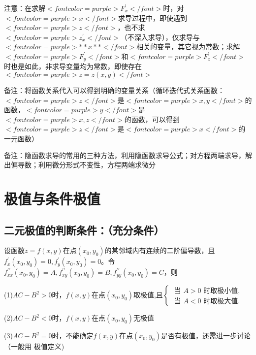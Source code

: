 注意：在求解$ <font color=purple>F^{\prime}_x</font> $时，对$ <font color=purple>x</font> $求导过程中，即使遇到$ <font color=purple>z</font> $，也不求$ <font color=purple>z^{\prime}_x</font> $（不深入求导），仅求导与$ <font color=purple>**x**</font> $相关的变量，其它视为常数；求解$ <font color=purple>F^{\prime}_y</font> $和$ <font color=purple>F^{\prime}_z</font> $时也是如此，非求导变量均为常数，即使存在$ <font color=purple>z=z(x, y)</font> $

备注：将函数关系代入可以得到明确的变量关系（循环迭代式关系函数：$ <font color=purple>z</font> $是$ <font color=purple>x,y</font> $的函数，$ <font color=purple>y</font> $是$ <font color=purple>x,z</font> $的函数，可以得到$ <font color=purple>z</font> $是$ <font color=purple>x</font> $的一元函数）

备注：隐函数求导的常用的三种方法，利用隐函数求导公式；对方程两端求导，解出偏导数；利用微分形式不变性，方程两端求微分

\section{极值与条件极值}



\subsection{二元极值的判断条件：（充分条件）}

设函数$ z=f(x, y) $在点$ \left(x_{0}, y_{0}\right) $的某邻域内有连续的二阶偏导数，且$ f_{x}^{\prime}\left(x_{0}, y_{0}\right)=0, f_{y}^{\prime}\left(x_{0}, y_{0}\right)=0 $。令$ f_{x x}^{\prime \prime}\left(x_{0}, y_{0}\right)=A, f_{x y}^{\prime \prime}\left(x_{0}, y_{0}\right)=B, f_{y y}^{\prime \prime}\left(x_{0}, y_{0}\right)=C $，则

(1)$ A C-B^{2}>0 $时，$ f(x, y) $在点$ \left(x_{0}, y_{0}\right) $取极值,且$ \left\{\begin{array}{l}\text { 当 } A>0 \text { 时取极小值, } \\ \text { 当 } A<0 \text { 时取极大值. }\end{array}\right. $

(2)$ A C-B^{2}<0 $时，$ f(x, y) $在点$ \left(x_{0}, y_{0}\right) $无极值

(3)$ A C-B^{2}=0 $时，不能确定$ f(x, y) $在点$ \left(x_{0}, y_{0}\right) $是否有极值，还需进一步讨论（一般用 极值定义)



